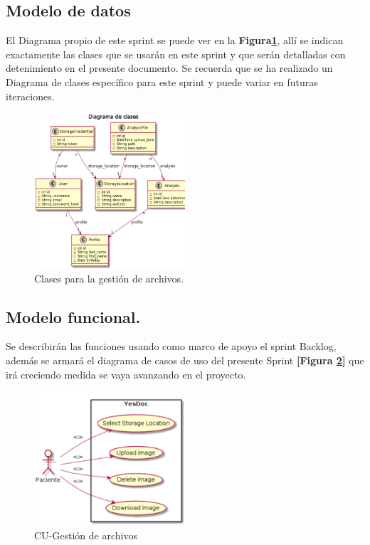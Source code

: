 \documentclass[a4paper,12pt]{article}
\begin{document}
\subsection{Modelo de datos}
El Diagrama propio de este sprint se puede ver en la \textbf{Figura\ref{6-clases_file_upload}}, allí se indican exactamente las clases que se usarán en este sprint y que serán detalladas con detenimiento en el presente documento. Se recuerda que se ha realizado un Diagrama de clases específico para este sprint y puede variar en futuras iteraciones.
    \begin{figure}[h]
        \centering
        \includegraphics[width=0.5\textwidth]{img/dc_file_upload}
        \caption{Clases para la gestión de archivos.}
		\label{6-clases_file_upload}
    \end{figure}

\subsection{ Modelo funcional.} %
Se describirán las funciones usando como marco de apoyo el sprint Backlog, además se armará el diagrama de casos de uso del presente Sprint \textbf{[Figura \ref{6-cu_file_upload}]} que irá creciendo  medida se vaya avanzando en el proyecto.

    \begin{figure}[h]
        \centering
        \includegraphics[width=0.5\textwidth]{img/cu_file_upload}
        \caption{CU-Gestión de archivos}
		\label{6-cu_file_upload}
    \end{figure}
\end{document}
